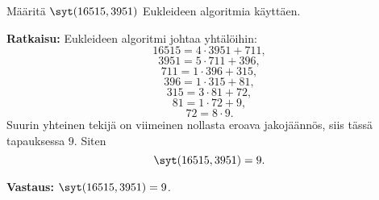 \begin{esimerkki}
Määritä $\syt(16515, 3951)$ Eukleideen
algoritmia käyttäen.

{\bf Ratkaisu:}
Eukleideen algoritmi johtaa yhtälöihin:
\[
16515 = 4 \cdot 3951 + 711,
\]
\[
3951 = 5 \cdot 711 + 396,
\]
\[
711 = 1 \cdot 396 + 315,
\]
\[
396 = 1 \cdot 315 + 81,
\]
\[
315 = 3 \cdot 81 + 72,
\]
\[
81 = 1 \cdot 72 + 9,
\]
\[
72 = 8 \cdot 9.
\]
Suurin yhteinen tekijä on viimeinen nollasta eroava
jakojäännös, siis tässä tapauksessa $9$. Siten
\[
\syt(16515, 3951) = 9.
\]

{\bf Vastaus:} $\syt(16515, 3951) = 9$.
\end{esimerkki}



\Harjoitustehtavat

